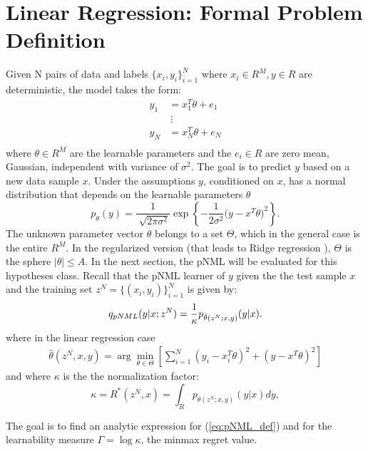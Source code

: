 \documentclass[conference,letterpaper]{IEEEtran}
\begin{document}
\section{Linear Regression: Formal Problem Definition} \label{sec:formal_problem_def}
Given N pairs of data and labels $\{x_i, y_i\}_{i=1}^{N}$ where $x_i \in R^M, y\in R$ are deterministic, the model takes the form:
\begin{equation}
\begin{split}
y_1&=x_1^T \theta + e_1 \\
   &\ \vdots \\
y_{N}&=x_{N}^T \theta + e_{N} \\
\end{split}
\end{equation}
where $\theta \in R^M$ are the learnable parameters and the $e_i \in R$ are zero mean, Gaussian, independent with variance of $\sigma^2$. 
The goal is to predict $y$ based on a new data sample $x$. 
Under the assumptions $y$, conditioned on $x$, has a normal distribution that depends on the learnable parameters $\theta$ 
\begin{equation}
p_{\theta}(y) 
=\frac{1}{\sqrt[]{2\pi\sigma^2}}\exp\left\{-\frac{1}{2\sigma^2}\big(y- x^T\theta \big)^2\right\}.
\end{equation}
The unknown parameter vector $\theta$ belongs to a set $\Theta$, which in the general case is the entire $R^M$. In the regularized version (that leads to Ridge regression \cite{ridgeregression}), $\Theta$ is the sphere $|\theta|\leq A$. 
In the next section, the pNML will be evaluated for this hypotheses class. 
Recall that the pNML learner of $y$ given the the test sample $x$ and the training set $z^N=\{(x_i,y_i)\}_{i=1}^{N}$ is given by:
\begin{equation} \label{eq:pNML_def}
q_{\mbox{\tiny{pNML}}}(y|x;z^N) = \frac{1}{\kappa} p_{\hat{\theta}(z^N;x,y)}(y|x).
\end{equation}
where in the linear regression case 
\begin{align}
\hat{\theta}(z^N,x,y)= \arg\min_{\theta\in\Theta} \left[ \sum_{i=1}^N \left(y_i - x_i^T\theta \right)^2 + \left(y-x^T\theta\right)^2 \right]
\end{align}
and where  $\kappa$ is the the normalization factor:
\begin{equation} \label{gamma}
\kappa = R^*(z^N,x) = \int_R  p_{\hat{\theta}(z^N;x,y)}(y|x)dy,   
\end{equation}

The goal is to find an analytic expression for (\ref{eq:pNML_def}) and for the learnability measure $\Gamma = \log \kappa$, the minmax regret value.
\end{document}
